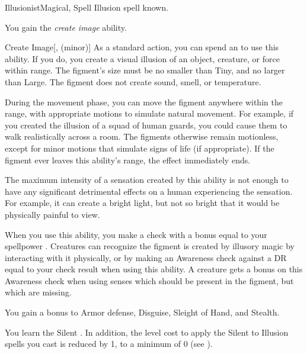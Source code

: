     \begin{feat}{Illusionist}{Magical, Spell}
        \featpre Illusion spell known.

         You gain the \textit{create image} ability.
        \begin{ability}{Create Image}[,  (minor)]
            As a standard action, you can spend an  to use this ability.
            If you do, you create a visual illusion of an object, creature, or force within \rngmed range.
            The figment's size must be no smaller than Tiny, and no larger than Large.
            The figment does not create sound, smell, or temperature.

            During the movement phase, you can move the figment anywhere within the range, with appropriate motions to simulate natural movement.
            For example, if you created the illusion of a squad of human guards, you could cause them to walk realistically across a room.
            The figments otherwise remain motionless, except for minor motions that simulate signs of life (if appropriate).
            If the figment ever leaves this ability's range, the effect immediately ends.

            The maximum intensity of a sensation created by this ability is not enough to have any significant detrimental effects on a human experiencing the sensation.
            For example, it can create a bright light, but not so bright that it would be physically painful to view.

            When you use this ability, you make a check with a bonus equal to your spellpower .
            Creatures can recognize the figment is created by illusory magic by interacting with it physically, or by making an Awareness check against a DR equal to your check result when using this ability.
            A creature gets a  bonus on this Awareness check when using senses which should be present in the figment, but which are missing.
        \end{ability}

         You gain a  bonus to Armor defense, Disguise, Sleight of Hand, and Stealth.

         You learn the Silent .
        In addition, the level cost to apply the Silent  to Illusion spells you cast is reduced by 1, to a minimum of 0 (see ).


\end{feat}
